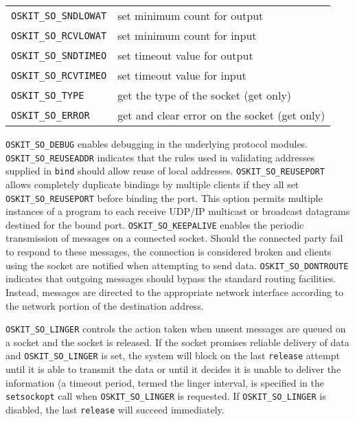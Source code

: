 \begin{apiparm}
\begin{tabular}{ll}
           \texttt{OSKIT_SO_SNDLOWAT} &
		     set minimum count for output \\
           \texttt{OSKIT_SO_RCVLOWAT} &
		     set minimum count for input \\
           \texttt{OSKIT_SO_SNDTIMEO} &
		     set timeout value for output \\
           \texttt{OSKIT_SO_RCVTIMEO} &
		     set timeout value for input \\
           \texttt{OSKIT_SO_TYPE} &
		         get the type of the socket (get only) \\
           \texttt{OSKIT_SO_ERROR} &
		        get and clear error on the socket (get only) \\
	\end{tabular}

	\texttt{OSKIT_SO_DEBUG} enables debugging in the underlying 
   	protocol modules.
	\texttt{OSKIT_SO_REUSEADDR} indicates that the rules used in 
	validating addresses supplied in \texttt{bind}
	should allow reuse of local addresses.
	\texttt{OSKIT_SO_REUSEPORT} allows completely duplicate bindings 
	by multiple clients if they all set \texttt{OSKIT_SO_REUSEPORT} 
	before binding the port. This option permits multiple instances
	of a program to each receive UDP/IP multicast or
	broadcast datagrams destined for the bound port.
	\texttt{OSKIT_SO_KEEPALIVE} enables the periodic transmission of 
	messages on a connected socket. Should the
	connected party fail to respond to these messages, the connection is 
	considered broken and clients using the socket are notified
	when attempting to send data.
	\texttt{OSKIT_SO_DONTROUTE} indicates that outgoing 
	messages should bypass the standard routing facilities.
	Instead, messages are directed to the appropriate network interface
	according to the network portion of the destination address.

	\texttt{OSKIT_SO_LINGER} controls the action taken when unsent 
	messages are queued on a socket and the socket is released.
	If the socket promises reliable delivery of data and 
	\texttt{OSKIT_SO_LINGER} is set, the system will block on the last
	\texttt{release} attempt until it is able to transmit the data
	or until it decides it is unable to deliver the information
	(a timeout period, termed the linger interval, is specified in the 
	\texttt{setsockopt} call when \texttt{OSKIT_SO_LINGER} is requested.
	If \texttt{OSKIT_SO_LINGER} is disabled, the last \texttt{release}
	will succeed immediately. %


\end{apiparm}

